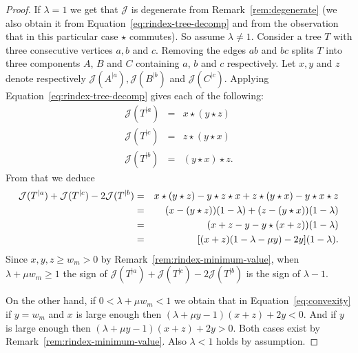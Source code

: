 \documentclass[11 pt]{modarticle}
\newcommand{\wmin}{w_m}
\newcommand{\rtree}[2]{{#1}^{\lvert #2}}
\newcommand{\rindexsymbol}{\mathcal{J}}
\newcommand{\rindex}[2]{\rindexsymbol(\rtree{#2}{#1})}
\begin{document}
\begin{proof}
If $\lambda = 1$ we get that $\rindexsymbol$ is degenerate from Remark~\ref{rem:degenerate} (we also obtain it from Equation~\eqref{eq:rindex-tree-decomp} and from the observation that in this particular case $\star$ commutes). So assume $\lambda \neq 1$. Consider a tree $T$ with three consecutive vertices $a,b$ and $c$. Removing the edges $ab$ and $bc$ splits $T$ into three components $A$, $B$ and $C$ containing $a$, $b$ and $c$ respectively. Let $x,y$ and $z$ denote respectively $\rindex{a}{A}, \rindex{b}{B}$ and $\rindex{c}{C}$. Applying Equation~\eqref{eq:rindex-tree-decomp} gives each of the following:
\begin{eqnarray*}
	\rindex{a}{T} & = & x \star (y \star z) \\
	\rindex{c}{T} & = & z \star (y \star x) \\
	\rindex{b}{T} & = & (y \star x) \star z.
\end{eqnarray*}
From that we deduce
\begin{eqnarray}
	\rindex{a}{T} + \rindex{c}{T} - 2 \rindex{b}{T} & = & x \star (y \star z) - y \star z \star x +  z \star (y \star x) - y\star x \star z \notag \\  
	& = & (x - (y\star z))(1 - \lambda) + (z - (y \star x))(1 - \lambda) \notag \\
	& = & (x + z - y - y \star (x + z)) (1 - \lambda) \notag\\
	& = & [(x + z)(1 - \lambda - \mu y) - 2y] (1 - \lambda). \label{eq:convexity}
\end{eqnarray}
Since $x,y,z \geq \wmin > 0$ by Remark~\ref{rem:rindex-minimum-value}, when $\lambda + \mu \wmin \geq 1$ the sign of $\rindex{a}{T} + \rindex{c}{T} - 2 \rindex{b}{T}$ is the sign of $\lambda - 1$.

On the other hand, if $0 < \lambda + \mu \wmin < 1$ we obtain that in Equation~\eqref{eq:convexity} if $y = \wmin$ and $x$ is large enough then $(\lambda + \mu y - 1)(x+z) + 2y < 0$. And if $y$ is large enough then $(\lambda + \mu y - 1)(x+z) + 2y > 0$. Both cases exist by Remark~\ref{rem:rindex-minimum-value}. Also $\lambda < 1$ holds by assumption.
\end{proof}
\end{document}
